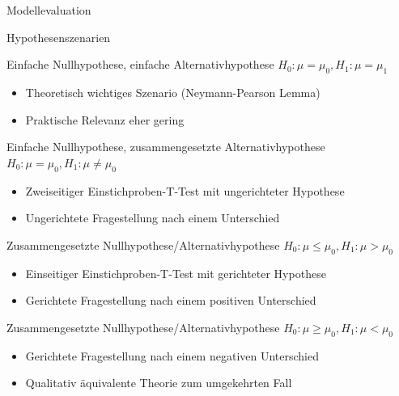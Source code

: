 \documentclass[
  8pt,
  ignorenonframetext,
]{beamer}
\begin{document}
\begin{frame}{Modellevaluation}
\protect\hypertarget{modellevaluation-1}{}
\small

Hypothesenszenarien


Einfache Nullhypothese, einfache Alternativhypothese
\(H_0:\mu = \mu_0, H_1:\mu = \mu_1\)

\begin{itemize}
\item Theoretisch wichtiges Szenario (Neymann-Pearson Lemma)
\item Praktische Relevanz eher gering
\end{itemize}

Einfache Nullhypothese, zusammengesetzte Alternativhypothese
\(H_0:\mu = \mu_0, H_1:\mu \neq \mu_0\)

\begin{itemize}
\item Zweiseitiger Einstichproben-T-Test mit ungerichteter Hypothese
\item Ungerichtete Fragestellung nach einem Unterschied
\end{itemize}

Zusammengesetzte Nullhypothese/Alternativhypothese
\(H_0:\mu \le \mu_0, H_1:\mu > \mu_0\)

\begin{itemize}
\item Einseitiger Einstichproben-T-Test mit gerichteter Hypothese
\item Gerichtete Fragestellung nach einem positiven Unterschied
\end{itemize}

Zusammengesetzte Nullhypothese/Alternativhypothese
\(H_0:\mu\ge\mu_0,H_1:\mu<\mu_0\)

\begin{itemize}
\item Gerichtete Fragestellung nach einem negativen Unterschied
\item Qualitativ äquivalente Theorie zum umgekehrten Fall
\end{itemize}
\end{frame}
\end{document}
